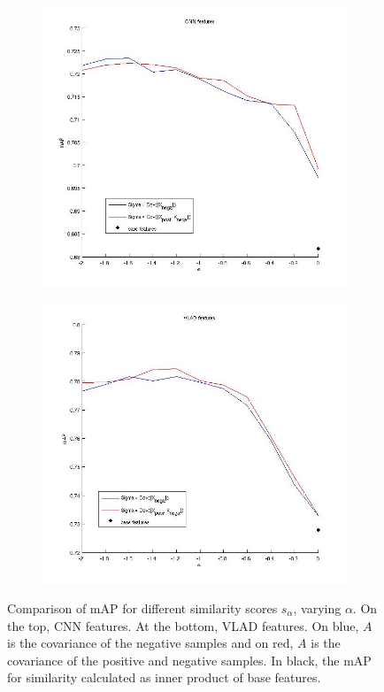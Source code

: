 \documentclass[10pt,twocolumn,letterpaper]{article}
\begin{document}
\begin{figure}[!h]
\centering
\begin{subfigure}[b]{0.45\textwidth}
\includegraphics[width=\textwidth]{whitening_cnn.jpg}
\end{subfigure}
\begin{subfigure}[b]{0.45\textwidth}
\includegraphics[width=\textwidth]{whitening_vlad.jpg}
\end{subfigure}
\caption{Comparison of mAP for different similarity scores $s_{\alpha}$, varying $\alpha$. On the top, CNN features. At the bottom, VLAD features. On blue, $A$ is the covariance of the negative samples and on red, $A$ is the covariance of the positive and negative samples. In black, the mAP for similarity calculated as inner product of base features.}
\label{salpha:vladcnn}
\end{figure}
\end{document}

